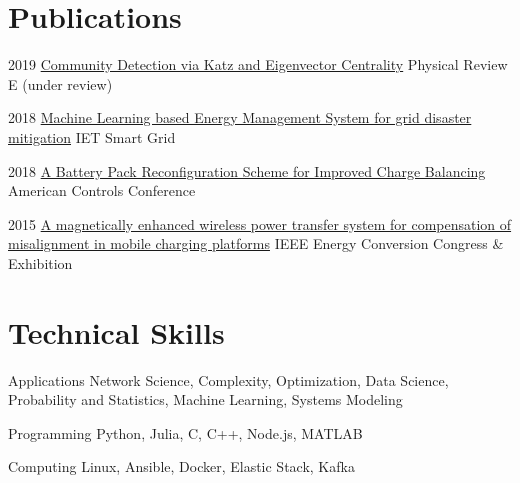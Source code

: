 \documentclass{tccv}
\begin{document}
\section{Publications}
\begin{yearlist}
	\item{2019}
	{\href{htts://arxiv.org}{Community Detection via Katz and Eigenvector Centrality}}
	{Physical Review E (under review)}
	
	\item{2018}
	{\href{https://digital-library.theiet.org/content/journals/10.1049/iet-stg.2018.0043}{Machine Learning based Energy Management System for grid disaster mitigation}}
	{IET Smart Grid}
	
	\item{2018}
	{\href{https://ieeexplore.ieee.org/document/8431612}{A Battery Pack Reconfiguration Scheme for Improved Charge Balancing}}
	{American Controls Conference}
	
	\item{2015}
	{\href{http://ieeexplore.ieee.org/document/7309840/}{A magnetically enhanced wireless power transfer system for compensation of misalignment in mobile charging platforms}}
	{IEEE Energy Conversion Congress \& Exhibition}
	
\end{yearlist}

\section{Technical Skills}

\begin{factlist}
\item {Applications}
	{Network Science, Complexity, Optimization, Data Science, Probability and Statistics, Machine Learning, Systems Modeling}

\item{Programming}
    {Python, Julia, C, C++, Node.js, MATLAB}
    
\item{Computing}
     {Linux, Ansible, Docker, Elastic Stack, Kafka}



\end{factlist}
\end{document}
